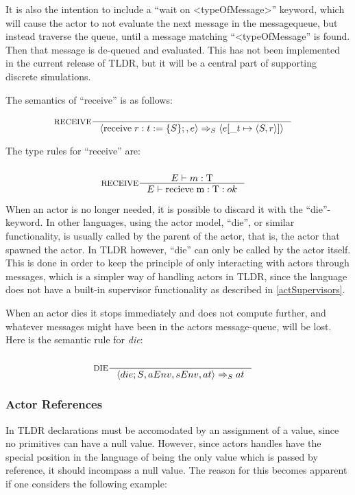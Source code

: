 It is also the intention to include a \enquote{wait on <typeOfMessage>} keyword, which will cause the actor to not evaluate the next message in the messagequeue, but instead traverse the queue, until a message matching \enquote{<typeOfMessage} is found. Then that message is de-queued and evaluated. This has not been implemented in the current release of TLDR, but it will be a central part of supporting discrete simulations.

The semantics of \enquote{receive} is as follows:

\begin{align*}
&\inference[$\text{RECEIVE}$]{}
                           {\Braket{\Treceive r:t := \{S\};,e} \Rightarrow_S \Braket{e[\_t \mapsto \Braket{S,r}]}}
\end{align*}

The type rules for \enquote{receive} are:

\begin{align*}
\intertext{}
&\inference[RECEIVE]{\Tenv m : \Tt}
                 {\Tenv \mathbin{\text{recieve}} \; \mathbin{\text{m}} :\Tt : ok }
\end{align*}

When an actor is no longer needed, it is possible to discard it with the \enquote{die}-keyword. In other languages, using the actor model, \enquote{die}, or similar functionality, is usually called by the parent of the actor, that is, the actor that spawned the actor. In TLDR however, \enquote{die} can only be called by the actor itself. This is done in order to keep the principle of only interacting with actors through messages, which is a simpler way of handling actors in TLDR, since the language does not have a built-in supervisor functionality as described in \cref{actSupervisors}. 

When an actor dies it stops immediately and does not compute further, and whatever messages might have been in the actors message-queue, will be lost.
Here is the semantic rule for \emph{die}:
\begin{align*}
\intertext{}
&\inference[DIE]{}
                 {\Braket{{die;S}, aEnv, sEnv, at} \Rightarrow_S at}
\end{align*}

\subsubsection{Actor References}

In TLDR declarations must be accomodated by an assignment of a value, since no primitives can have a null value. However, since actors handles have the special position in the language of being the only value which is passed by reference, it should incompass a null value. The reason for this becomes apparent if one considers the following example:

